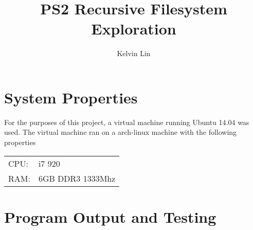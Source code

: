 \documentclass[12pt]{article}
\title{PS2 Recursive Filesystem Exploration}
\author{Kelvin Lin}
\begin{document}
\maketitle

\section{System Properties}
For the purposes of this project, a virtual machine running Ubuntu 14.04 was used.
The virtual machine ran on a arch-linux machine with the following properties

\begin{tabular}{l l}
CPU: & i7 920 \\
RAM: & 6GB DDR3 1333Mhz \\
\end{tabular}

\section{Program Output and Testing}
\end{document}
